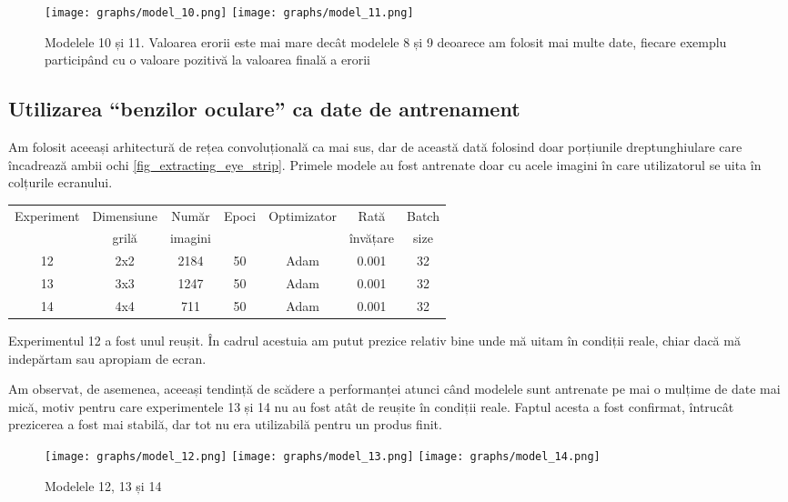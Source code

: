 \begin{figure}
    \centering
    \texttt{[image: graphs/model\_10.png]}
    \texttt{[image: graphs/model\_11.png]}
    \caption{Modelele 10 și 11. Valoarea erorii este mai mare decât modelele 8 și 9 deoarece am folosit mai multe date, fiecare exemplu participând cu o valoare pozitivă la valoarea finală a erorii}
\end{figure}

\subsection{Utilizarea ``benzilor oculare'' ca date de antrenament}
Am folosit aceeași arhitectură de rețea convoluțională ca mai sus, dar de această dată folosind doar porțiunile dreptunghiulare care încadrează ambii ochi \ref{fig_extracting_eye_strip}.
Primele modele au fost antrenate doar cu acele imagini în care utilizatorul se uita în colțurile ecranului.

\begin{center}
    \begin{tabular}{ c | c | c | c | c | c | c }
        \hline
        Experiment & Dimensiune & Număr   & Epoci & Optimizator & Rată     & Batch \\ 
                   & grilă      & imagini &       &             & învățare & size  \\ 
        \hline
        12 & 2x2 & 2184 & 50 & Adam & 0.001 & 32 \\
        \hline
        13 & 3x3 & 1247 & 50 & Adam & 0.001 & 32 \\
        \hline
        14 & 4x4 & 711 & 50 & Adam & 0.001 & 32 \\
        \hline
    \end{tabular}
\end{center}

Experimentul 12 a fost unul reușit.
În cadrul acestuia am putut prezice relativ bine unde mă uitam în condiții reale, chiar dacă mă indepărtam sau apropiam de ecran.

Am observat, de asemenea, aceeași tendință de scădere a performanței atunci când modelele sunt antrenate pe mai o mulțime de date mai mică, motiv pentru care experimentele 13 și 14 nu au fost atât de reușite în condiții reale.
Faptul acesta a fost confirmat, întrucât prezicerea a fost mai stabilă, dar tot nu era utilizabilă pentru un produs finit.

\begin{figure}
    \centering
    \texttt{[image: graphs/model\_12.png]}
    \texttt{[image: graphs/model\_13.png]}
    \texttt{[image: graphs/model\_14.png]}
    \caption{Modelele 12, 13 și 14}
\end{figure}

